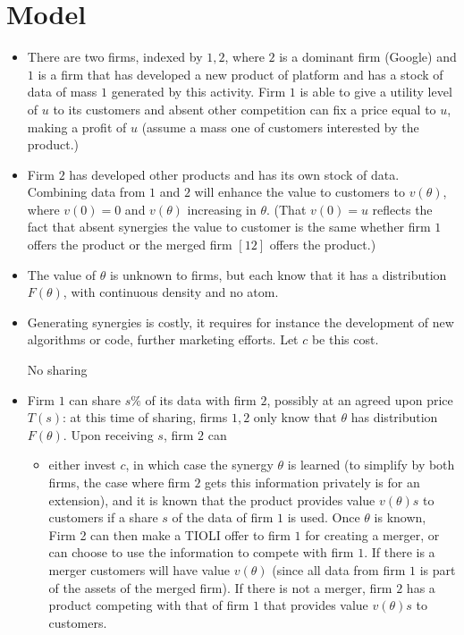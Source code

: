 \documentclass[a4paper,leqno]{article}%
\renewcommand{\t}{\theta}
\begin{document}
\section{Model}

\begin{itemize}

    \item There are two firms, indexed by $1,2$, where $2$ is a dominant firm (Google) and $1$ is a firm that has developed a new product of platform and has a stock of data of mass $1$ generated by this activity. Firm $1$ is able to give a utility level of $u$ to its customers and absent other competition can fix a price equal to $u$, making a profit of $u$ (assume a mass one of customers interested by the product.)

    \item Firm $2$ has developed other products and has its own stock of data. Combining data from $1$ and $2$ will enhance the value to customers to $v(\t)$, where $v(0)=0$ and $v(\t)$ increasing in $\t$. (That $v(0)=u$ reflects the fact that absent synergies the value to customer is the same whether firm $1$ offers the product or the merged firm $[12]$ offers the product.)

    \item The value of $\t$ is unknown to firms, but each know that it has a distribution $F(\t)$, with continuous density and no atom.

    \item Generating synergies is costly, it requires for instance the development of new algorithms or code, further marketing efforts. Let $c$ be this cost. 

    \item [No sharing]

    \item Firm $1$ can share $s\%$ of its data with firm $2$, possibly at an agreed upon price $T(s)$: at this time of sharing, firms $1,2$ only know that $\t$ has distribution $F(\t)$. Upon receiving $s$, firm $2$ can 

    \begin{itemize}

        \item either invest $c$, in which case the synergy $\t$ is learned (to simplify by both firms, the case where firm $2$ gets this information privately is for an extension), and it is known that the product provides value $v(\t)s$ to customers if a share $s$ of the data of firm $1$ is used. Once $\t$ is known, Firm 2 can then make a TIOLI offer to firm $1$ for creating a merger, or can choose to use the information to compete with firm $1$. If there is a merger customers will have value $v(\t)$ (since all data from firm $1$ is part of the assets of the merged firm). If there is not a merger, firm $2$ has a product competing with that of firm $1$ that provides value $v(\t)s$ to customers.


\end{itemize}
\end{itemize}
\end{document}
